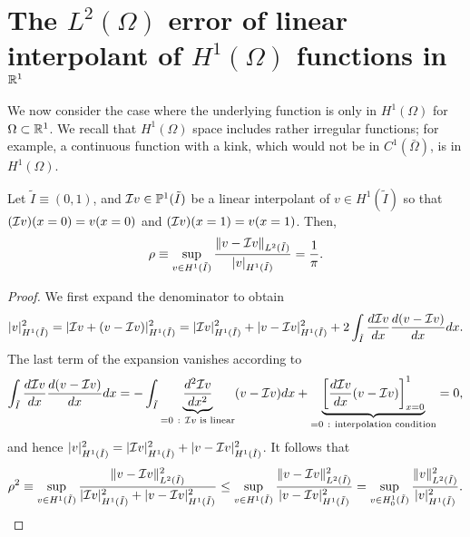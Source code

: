 \section{The $L^2(\Omega)$ error of linear interpolant of $H^1(\Omega)$ functions in $\mathbb{R}^1$}
\label{sec:th_interp_l2_h1}
We now consider the case where the underlying function is only in $H^1(\Omega)$ for $\Omega \subset \mathbb{R}^1$.  We recall that $H^1(\Omega)$ space includes rather irregular functions; for example, a continuous function with a kink, which would not be in $C^1(\bar \Omega)$, is in $H^1(\Omega)$. 
\begin{proposition}
  \label{lemma:th_l2_h1_embed}
Let $\tilde I \equiv (0,1)$, and $\mathcal{I} v \in \mathbb{P}^1(\tilde I)$ be a linear interpolant of $v \in H^1(\tilde I)$ so that $(\mathcal{I} v)(x=0) = v(x=0)$ and $(\mathcal{I} v)(x=1) = v(x=1)$.  Then,
\begin{equation*}
  \rho \equiv \sup_{v \in H^1(\tilde I)} \frac{\| v - \mathcal{I} v \|_{L^2(\tilde I)}}{| v |_{H^1(\tilde I)}} = \frac{1}{\pi}.
\end{equation*}
\begin{proof}
  We first expand the denominator to obtain
  \begin{equation*}
    | v |_{H^1(\tilde I)}^2
    = | \mathcal{I} v + (v - \mathcal{I} v) |_{H^1(\tilde I)}^2
    =  | \mathcal{I} v |_{H^1(\tilde I)}^2 +  | v - \mathcal{I} v |_{H^1(\tilde I)}^2 + 2 \int_{\tilde I} \frac{d \mathcal{I} v}{d x} \frac{d (v - \mathcal{I} v)}{d x} dx .
  \end{equation*}
  The last term of the expansion vanishes according to
  \begin{equation*}
    \int_{\tilde I} \dd{\calI v}{x} \dd{(v - \calI v)}{x} dx
    =
    - \int_{\tilde I} \underbrace{\dd{^2 \calI v}{x^2}}_{=0\ :\ \text{$\calI v$ is linear}} (v - \calI v) dx
    + \underbrace{\left[ \dd{\calI v}{x} (v - \calI v) \right]_{x=0}^1}_{=0\ :\ \text{interpolation condition}} = 0,
  \end{equation*}
  and hence $ | v |_{H^1(\tilde I)}^2 =  | \mathcal{I} v |_{H^1(\tilde I)}^2 +  | v - \mathcal{I} v |_{H^1(\tilde I)}^2 $.  It follows that
  \begin{equation*} 
    \rho^2
    \equiv \sup_{v \in H^1(\tilde I)} \frac{\| v - \mathcal{I} v \|^2_{L^2(\tilde I)}}{| \mathcal{I} v |_{H^1(\tilde I)}^2 +  | v - \mathcal{I} v |_{H^1(\tilde I)}^2}
    \leq  \sup_{v \in H^1(\tilde I)} \frac{\| v - \mathcal{I} v \|^2_{L^2(\tilde I)}}{| v - \mathcal{I} v |_{H^1(\tilde I)}^2}
    =\sup_{v \in H^1_0(\tilde I)} \frac{\| v \|^2_{L^2(\tilde I)}}{| v |_{H^1(\tilde I)}^2}.
  \end{equation*}

\end{proof}
\end{proposition}
